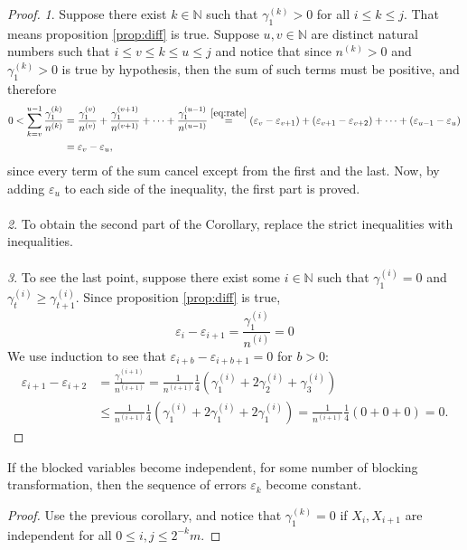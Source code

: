 \documentclass[11pt,english,a4paper]{article}
\begin{document}
\begin{proof}
\textit{1}. Suppose there exist $k \in \mathbb{N}$ such that $\gamma^{(k)}_1 > 0$ for all $i \leq k \leq j$. That means proposition \ref{prop:diff} is true. Suppose $u,v \in \mathbb{N}$ are distinct natural numbers such that $i \leq v \leq k \leq u \leq j$ and notice that since $n^{(k)} > 0$ and $\gamma^{(k)}_1 > 0$ is true by hypothesis, then the sum of such terms must be positive, and therefore
\begin{align*}
0 < \sum_{k = v}^{u-1} \frac{\gamma^{(k)}_1 }{n^{(k)}} &= \frac{\gamma^{(v)}_1}{n^{(v)}} + \frac{\gamma^{(v+1)}_1}{n^{(v+1)}} + \cdots + \frac{\gamma^{(u-1)}_1}{n^{(u-1)}} \stackrel{\eqref{eq:rate}}{=} (\varepsilon_v - \varepsilon_{v+1}) + (\varepsilon_{v+1} - \varepsilon_{v+2}) + \cdots + (\varepsilon_{u-1} - \varepsilon_{u}) \\
&= \varepsilon_v - \varepsilon_{u},
\end{align*}
since every term of the sum cancel except from the first and the last. Now, by adding $\varepsilon_u$ to each side of the inequality, the first part is proved. \\
\\
\textit{2}. To obtain the second part of the Corollary, replace the strict inequalities with inequalities.\\
\\
\textit{3}. To see the last point, suppose there exist some $i \in \mathbb{N}$ such that $\gamma^{(i)}_1 = 0$ and $\gamma^{(i)}_t \geq \gamma^{(i)}_{t+1}$. Since proposition \ref{prop:diff} is true,
\[
\varepsilon_i - \varepsilon_{i+1} = \frac{\gamma_1^{(i)}}{n^{(i)}} = 0
\]
We use induction to see that $\varepsilon_{i+b} - \varepsilon_{i+b+1} = 0$ for $b > 0$:
\begin{align*}
\varepsilon_{i+1} - \varepsilon_{i+2} &= \frac{\gamma_1^{(i+1)}}{n^{(i+1)}} = \frac{1}{n^{(i+1)}} \frac{1}{4} \left( \gamma^{(i)}_{1} + 2 \gamma^{(i)}_{2} + \gamma^{(i)}_{3} \right) \\
&\leq \frac{1}{n^{(i+1)}} \frac{1}{4} \left( \gamma^{(i)}_{1} + 2 \gamma^{(i)}_{1} + 2 \gamma^{(i)}_{1} \right) = \frac{1}{n^{(i+1)}} \frac{1}{4} \left( 0+0+0 \right) = 0.
\end{align*}
\end{proof}

\begin{corollary*}
If the blocked variables become independent, for some number of blocking transformation, then the sequence of errors $\varepsilon_k$ become constant.
\end{corollary*}
\begin{proof}
Use the previous corollary, and notice that $\gamma^{(k)}_1 = 0$ if $X_i,X_{i+1}$ are independent for all $0 \leq i,j \leq 2^{-k}m$.
\end{proof}
\end{document}
